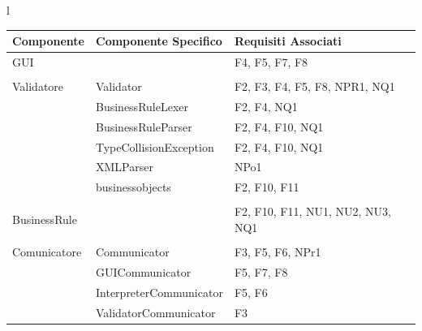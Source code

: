 \documentclass[11pt,titlepage,a4paper]{report}
\begin{document}
\begin{center}
\begin{table}[hbtp]
\large{
\begin{tabular}{l}
\begin{tabular}{||p{2.6cm}||p{4.6cm}||p{2.8cm}||} \hline
\textbf{Componente} & \textbf{Componente Specifico} & \textbf{Requisiti Associati} \\ \hline

GUI & & F4, F5, F7, F8\\ \hline
 &  & \\ \hline

Validatore & Validator & F2, F3, F4, F5, F8, NPR1, NQ1\\ \hline
 & BusinessRuleLexer & F2, F4, NQ1 \\ \hline
 & BusinessRuleParser & F2, F4, F10, NQ1 \\ \hline
 & TypeCollisionException & F2, F4, F10, NQ1\\ \hline
 & XMLParser & NPo1\\ \hline
 & businessobjects & F2, F10, F11\\ \hline
 &  & \\ \hline

BusinessRule & & F2, F10, F11, NU1, NU2, NU3, NQ1\\ \hline
 &  & \\ \hline

Comunicatore & Communicator & F3, F5, F6, NPr1\\ \hline
 & GUICommunicator & F5, F7, F8\\ \hline
 & InterpreterCommunicator & F5, F6\\ \hline
 & ValidatorCommunicator & F3\\ \hline


\end{tabular} \\
\end{tabular}

}
\end{table}
\end{center}
\end{document}
